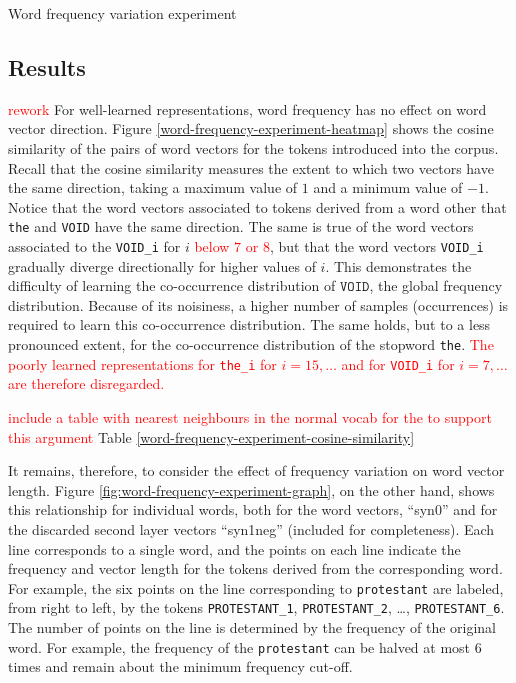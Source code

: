 \documentclass{article} %
\newcommand{\word}[1]{\texttt{#1}}
\begin{document}
\begin{section}{Word frequency variation experiment}
\subsection{Results}
\textcolor{red}{rework}
For well-learned representations, word frequency has no effect on word vector direction.
Figure \ref{word-frequency-experiment-heatmap} shows the cosine similarity of the pairs of word vectors for the tokens introduced into the corpus.
Recall that the cosine similarity measures the extent to which two vectors have the same direction, taking a maximum value of $1$ and a minimum value of $-1$.
Notice that the word vectors associated to tokens derived from a word other that \word{the} and \word{VOID} have the same direction.
The same is true of the word vectors associated to the \word{VOID\_i} for $i$ \textcolor{red}{below $7$ or $8$}, but that the word vectors \word{VOID\_i} gradually diverge directionally for higher values of $i$.
This demonstrates the difficulty of learning the co-occurrence distribution of $\word{VOID}$, the global frequency distribution.
Because of its noisiness, a higher number of samples (occurrences) is required to learn this co-occurrence distribution.
The same holds, but to a less pronounced extent, for the co-occurrence distribution of the stopword \word{the}.
\textcolor{red}{The poorly learned representations for \word{the\_i} for $i = 15, \dots $ and for \word{VOID\_i} for $i = 7, \dots$ are therefore disregarded.}

\textcolor{red}{include a table with nearest neighbours in the normal vocab for the to support this argument}
Table \ref{word-frequency-experiment-cosine-similarity}

It remains, therefore, to consider the effect of frequency variation on word vector length.
Figure \ref{fig:word-frequency-experiment-graph}, on the other hand, shows this relationship for individual words, both for the word vectors, ``syn0'' and for the discarded second layer vectors ``syn1neg'' (included for completeness).
Each line corresponds to a single word, and the points on each line indicate the frequency and vector length for the tokens derived from the corresponding word.
For example, the six points on the line corresponding to \word{protestant} are labeled, from right to left, by the tokens \word{PROTESTANT\_1}, \word{PROTESTANT\_2}, \dots, \word{PROTESTANT\_6}.
The number of points on the line is determined by the frequency of the original word.
For example, the frequency of the \word{protestant} can be halved at most $6$ times and remain about the minimum frequency cut-off.


\end{section}
\end{document}
